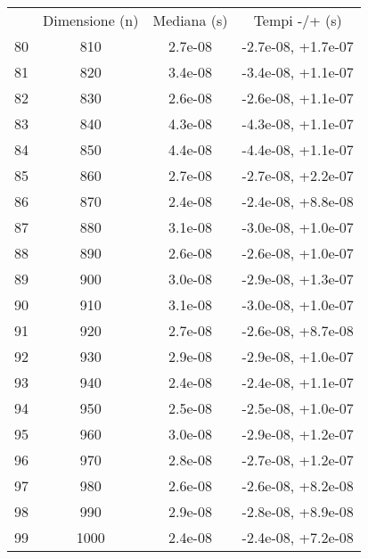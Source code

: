 \begin{table}
\centering
\begin{adjustbox}{width=1\textwidth/2}
\begin{tabular}{|c|c|c|c|}
\hline
 & Dimensione (n) & Mediana (s) & Tempi -/+ (s) \\
80 & 810 & 2.7e-08 & -2.7e-08, +1.7e-07 \\
\cline{1-4}
81 & 820 & 3.4e-08 & -3.4e-08, +1.1e-07 \\
\cline{1-4}
82 & 830 & 2.6e-08 & -2.6e-08, +1.1e-07 \\
\cline{1-4}
83 & 840 & 4.3e-08 & -4.3e-08, +1.1e-07 \\
\cline{1-4}
84 & 850 & 4.4e-08 & -4.4e-08, +1.1e-07 \\
\cline{1-4}
85 & 860 & 2.7e-08 & -2.7e-08, +2.2e-07 \\
\cline{1-4}
86 & 870 & 2.4e-08 & -2.4e-08, +8.8e-08 \\
\cline{1-4}
87 & 880 & 3.1e-08 & -3.0e-08, +1.0e-07 \\
\cline{1-4}
88 & 890 & 2.6e-08 & -2.6e-08, +1.0e-07 \\
\cline{1-4}
89 & 900 & 3.0e-08 & -2.9e-08, +1.3e-07 \\
\cline{1-4}
90 & 910 & 3.1e-08 & -3.0e-08, +1.0e-07 \\
\cline{1-4}
91 & 920 & 2.7e-08 & -2.6e-08, +8.7e-08 \\
\cline{1-4}
92 & 930 & 2.9e-08 & -2.9e-08, +1.0e-07 \\
\cline{1-4}
93 & 940 & 2.4e-08 & -2.4e-08, +1.1e-07 \\
\cline{1-4}
94 & 950 & 2.5e-08 & -2.5e-08, +1.0e-07 \\
\cline{1-4}
95 & 960 & 3.0e-08 & -2.9e-08, +1.2e-07 \\
\cline{1-4}
96 & 970 & 2.8e-08 & -2.7e-08, +1.2e-07 \\
\cline{1-4}
97 & 980 & 2.6e-08 & -2.6e-08, +8.2e-08 \\
\cline{1-4}
98 & 990 & 2.9e-08 & -2.8e-08, +8.9e-08 \\
\cline{1-4}
99 & 1000 & 2.4e-08 & -2.4e-08, +7.2e-08 \\
\cline{1-4}
\end{tabular}
\end{adjustbox}
\end{table}
